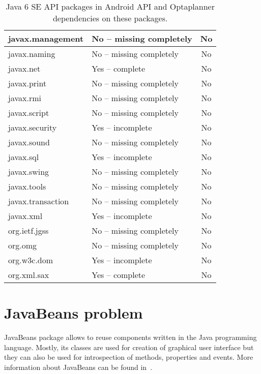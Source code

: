\begin {table}[h!]
\begin{tabular}{|l|l|c|}
        javax.management      & No -- missing completely  & No  \\ \hline
        javax.naming          & No -- missing completely  & No  \\ \hline
        javax.net             & Yes -- complete           & No  \\ \hline
        javax.print           & No -- missing completely  & No  \\ \hline
        javax.rmi             & No -- missing completely  & No  \\ \hline
        javax.script          & No -- missing completely  & No  \\ \hline
        javax.security        & Yes -- incomplete         & No  \\ \hline
        javax.sound           & No -- missing completely  & No  \\ \hline
        javax.sql             & Yes -- incomplete         & No  \\ \hline
        javax.swing           & No -- missing completely  & No  \\ \hline
        javax.tools           & No -- missing completely  & No  \\ \hline
        javax.transaction     & No -- missing completely  & No  \\ \hline
        javax.xml             & Yes -- incomplete         & No  \\ \hline
        org.ietf.jgss         & No -- missing completely  & No  \\ \hline
        org.omg               & No -- missing completely  & No  \\ \hline
        org.w3c.dom           & Yes -- incomplete         & No  \\ \hline
        org.xml.sax           & Yes -- complete           & No  \\ \hline
    \end{tabular}
    \centering
    \caption{Java 6 SE API packages in Android API and Optaplanner dependencies on these packages.}
    \label{ApiDiffTable}
\end{table}

\section{JavaBeans problem}\label{JavaBeansProblemSection}
JavaBeans package allows to reuse components written in the Java programming language. Mostly, its classes are used for
creation of graphical user interface but they can also be used for introspection of methods, properties and events.
More information about JavaBeans can be found in~\cite{Beans}.

